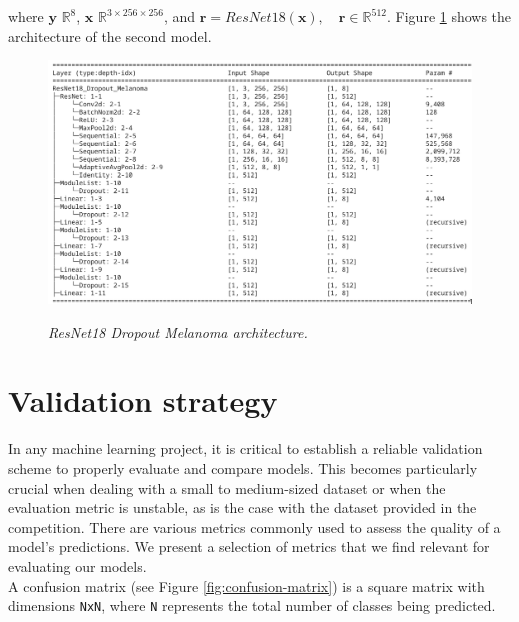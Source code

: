 where \( \mathbf{y} \) \in \( \mathbb{R}^8 \), \( \mathbf{x} \) \in \(
\mathbb{R}^{3 \times 256 \times 256} \),  and \(\mathbf{r} =
ResNet18(\mathbf{x}), \quad \mathbf{r} \in \mathbb{R}^{512}\). Figure
\ref{fig:resnet-18-dropout-melanoma-arch} shows the architecture of the second
model.

\begin{figure}[H]
  \centering
  \includegraphics[width=\textwidth]{imatges/methodological_contribution/ResNet18_Dropout_Melanoma.png}
  \caption[ResNet18\_Dropout\_Melanoma architecture]{\textit{ResNet18 Dropout Melanoma architecture.}}
  {\label{fig:resnet-18-dropout-melanoma-arch}}
\end{figure}


\section{Validation strategy}

In any machine learning project, it is critical to establish a reliable
validation scheme to properly evaluate and compare models. This becomes
particularly crucial when dealing with a small to medium-sized dataset or when
the evaluation metric is unstable, as is the case with the dataset provided in
the competition. There are various metrics commonly used to assess the quality of a model's
predictions. We present a selection of metrics that we find relevant for
evaluating our models. \\

A confusion matrix (see Figure \ref{fig:confusion-matrix}) is a square matrix
with dimensions {\tt NxN}, where {\tt N} represents the total number of classes being
predicted.


